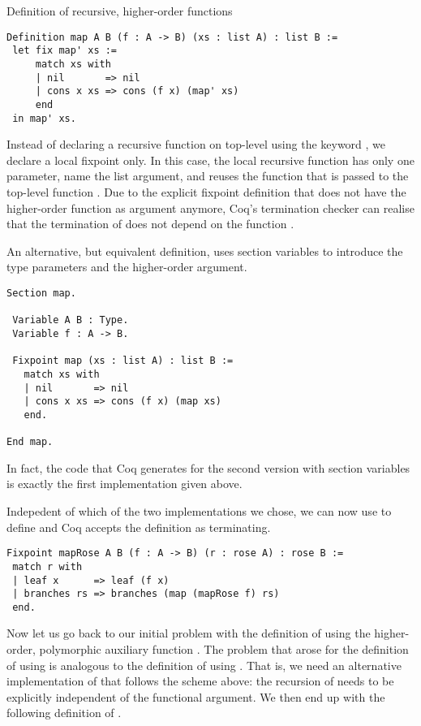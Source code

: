 \begin{excursus}{Definition of recursive, higher-order functions}
\begin{verbatim}
Definition map A B (f : A -> B) (xs : list A) : list B :=
 let fix map' xs :=
     match xs with
     | nil       => nil
     | cons x xs => cons (f x) (map' xs)
     end
 in map' xs.
\end{verbatim}

Instead of declaring a recursive function on top-level using the keyword , we declare a local fixpoint only.
In this case, the local recursive function  has only one parameter, name the list argument, and reuses the function  that is passed to the top-level function .
Due to the explicit fixpoint definition that does not have the higher-order function as argument anymore, Coq's termination checker can realise that the termination of  does not depend on the function .

An alternative, but equivalent definition, uses section variables to introduce the type parameters and the higher-order argument.

\begin{verbatim}
Section map.

 Variable A B : Type.
 Variable f : A -> B.

 Fixpoint map (xs : list A) : list B :=
   match xs with
   | nil       => nil
   | cons x xs => cons (f x) (map xs)
   end.

End map.
\end{verbatim}

In fact, the code that Coq generates for the second version with section variables is exactly the first implementation given above.

Indepedent of which of the two implementations we chose, we can now use  to define  and Coq accepts the definition as terminating.

\begin{verbatim}
Fixpoint mapRose A B (f : A -> B) (r : rose A) : rose B :=
 match r with
 | leaf x      => leaf (f x)
 | branches rs => branches (map (mapRose f) rs)
 end.
\end{verbatim}
\end{excursus}

Now let us go back to our initial problem with the definition of  using the higher-order, polymorphic auxiliary function .
The problem that arose for the definition of  using  is analogous to the definition of  using .
That is, we need an alternative implementation of  that follows the scheme above: the recursion of  needs to be explicitly independent of the functional argument.
We then end up with the following definition of .

